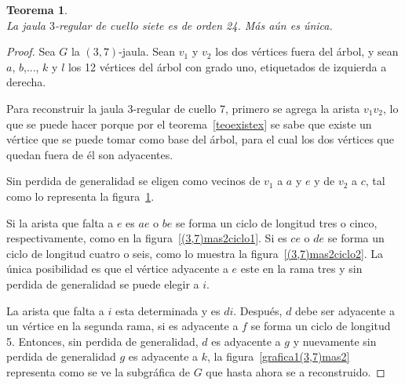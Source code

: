 \documentclass[12pt]{book}
\newtheorem{theorem}{Teorema}
\theoremstyle{definition}
\begin{document}
\begin{theorem}\textbf{}\\
La jaula $3$-regular de cuello siete es de orden 24. Más aún es única. 
\end{theorem}

\begin{proof}
Sea $G$ la $(3,7)$-jaula. Sean $v_1$ y $v_2$ los dos vértices fuera
del árbol, y sean $a$, $b$,..., $k$ y $l$ los 12 vértices del árbol
con grado uno, etiquetados de izquierda a derecha.

Para reconstruir la jaula 3-regular de cuello 7, primero se agrega la
arista $v_1v_2$, lo que se puede hacer porque por el
teorema~\ref{teoexistex} se sabe que existe un vértice que se puede
tomar como base del árbol, para el cual los dos vértices que quedan fuera de él son adyacentes.

Sin perdida de generalidad se eligen como vecinos de
$v_1$ a $a$ y $e$ y de $v_2$ a $c$, tal como lo representa la figura~\ref{grafica(3,7)mas2}.

\begin{figure}
  \centering
  \caption{} \label{grafica(3,7)mas2}
\end{figure}


Si la arista que falta a $e$ es $ae$ o $be$ se forma un ciclo de
longitud tres o cinco, respectivamente, como en la figura~\ref{(3,7)mas2ciclo1}.
Si es $ce$ o $de$ se forma un ciclo de longitud cuatro o seis,
como lo muestra la figura~\ref{(3,7)mas2ciclo2}. La única posibilidad es que
el vértice adyacente a $e$ este en la rama tres y sin perdida de
generalidad se puede elegir a $i$.

La arista que falta a $i$ esta determinada y es $di$.
Después, $d$ debe ser adyacente a un vértice en la segunda rama, si es
adyacente a $f$ se forma un ciclo de longitud 5.
Entonces, sin perdida de generalidad, $d$ es adyacente a $g$ y nuevamente sin
perdida de generalidad $g$ es adyacente a $k$, la
figura~\ref{grafica1(3,7)mas2} representa como se ve la subgráfica de
$G$ que hasta ahora se a reconstruido.


\end{proof}
\end{document}
